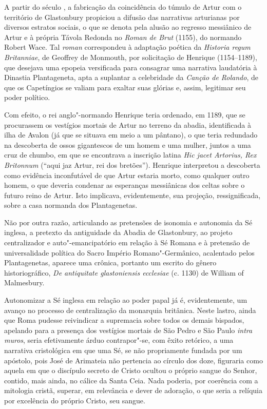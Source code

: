 A partir do século , a fabricação da coincidência do túmulo de Artur com o
território de Glastonbury propiciou a difusão das narrativas arturianas por
diversos estratos sociais, o que se denota pela alusão ao regresso messiânico
de Artur e à própria Távola Redonda no \textit{Roman de Brut} (1155), do
normando Robert Wace. Tal \textit{roman }correspondeu à adaptação poética da
\textit{Historia regum Britanniae}, de Geoffrey de Monmouth, por solicitação de
Henrique  (1154--1189), que desejava uma epopeia versificada para consagrar
uma narrativa laudatória à Dinastia Plantageneta, apta a suplantar a celebridade
da \textit{Canção de Rolando}, de que os Capetíngios se valiam para exaltar
suas glórias e, assim, legitimar seu poder político. 

Com efeito, o rei anglo"-normando Henrique  teria ordenado, em 1189, que se
procurassem os vestígios mortais de Artur no terreno da abadia, identificada à
ilha de Avalon (já que se situava em meio a um pântano), o que teria redundado
na descoberta de ossos gigantescos de um homem e uma mulher, juntos a uma cruz
de chumbo, em que se encontrava a inscrição latina \textit{Hic jacet Artorius,
Rex Britonnum} (“aqui jaz Artur, rei dos bretões”). Henrique  interpretou a
descoberta como evidência inconfutável de que Artur estaria morto, como
qualquer outro homem, o que deveria condenar as esperanças messiânicas dos
celtas sobre o futuro reino de Artur. Isto implicava, evidentemente, sua
projeção, ressignificada, sobre a casa normanda dos Plantagenetas.

Não por outra razão, articulando as pretensões de isonomia e autonomia da Sé
inglesa, a pretexto da antiguidade da Abadia de Glastonbury, ao projeto centralizador e
auto"-emancipatório em relação à Sé Romana e à pretensão de universalidade política do
Sacro Império Romano"-Germânico, acalentado pelos Plantagenetas, aparece uma
crônica, portanto um escrito do gênero historiográfico, \textit{De antiquitate glastoniensis
ecclesiae} (c. 1130) de William of Malmesbury.

Autonomizar a Sé inglesa em relação ao poder papal já é, evidentemente, um
avanço no processo de centralização da monarquia britânica. Neste lastro, ainda que
Roma pudesse reivindicar a supremacia sobre todos os demais bispados, apelando para
a presença dos vestígios mortais de São Pedro e São Paulo \textit{intra muros}, seria
efetivamente árduo contrapor"-se, com êxito retórico, a uma narrativa cristológica em
que uma Sé, se não propriamente fundada por um apóstolo, pois José de Arimateia não
pertencia ao círculo dos doze, figuraria como aquela em que o discípulo secreto de Cristo
ocultou o próprio sangue do Senhor, contido, mais ainda, no cálice da Santa Ceia. Nada
poderia, por coerência com a mitologia cristã, superar, em relevância e dever de
adoração, o que seria a relíquia por excelência do próprio Cristo, seu sangue.


